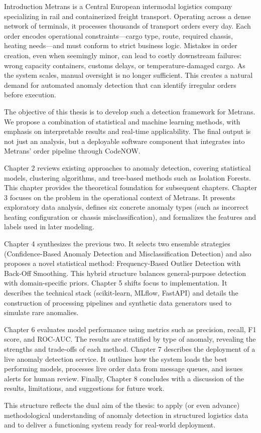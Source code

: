 \chap Introduction
Metrans is a Central European intermodal logistics company specializing in rail and containerized freight transport. Operating across a dense network of terminals, it processes thousands of transport orders every day. Each order encodes operational constraints—cargo type, route, required chassis, heating needs—and must conform to strict business logic. Mistakes in order creation, even when seemingly minor, can lead to costly downstream failures: wrong capacity containers, customs delays, or temperature-damaged cargo. As the system scales, manual oversight is no longer sufficient. This creates a natural demand for automated anomaly detection that can identify irregular orders before execution.

The objective of this thesis is to develop such a detection framework for Metrans. We propose a combination of statistical and machine learning methods, with emphasis on interpretable results and real-time applicability. The final output is not just an analysis, but a deployable software component that integrates into Metrans’ order pipeline through CodeNOW.

Chapter 2 reviews existing approaches to anomaly detection, covering statistical models, clustering algorithms, and tree-based methods such as Isolation Forests. This chapter provides the theoretical foundation for subsequent chapters. Chapter 3 focuses on the problem in the operational context of Metrans. It presents exploratory data analysis, defines six concrete anomaly types (such as incorrect heating configuration or chassis misclassification), and formalizes the features and labels used in later modeling.

Chapter 4 synthesizes the previous two. It selects two ensemble strategies (Confidence-Based Anomaly Detection and Misclassification Detection) and also proposes a novel statistical method: Frequency-Based Outlier Detection with Back-Off Smoothing. This hybrid structure balances general-purpose detection with domain-specific priors. Chapter 5 shifts focus to implementation. It describes the technical stack (scikit-learn, MLflow, FastAPI) and details the construction of processing pipelines and synthetic data generators used to simulate rare anomalies.

Chapter 6 evaluates model performance using metrics such as precision, recall, F1 score, and ROC-AUC. The results are stratified by type of anomaly, revealing the strengths and trade-offs of each method. Chapter 7 describes the deployment of a live anomaly detection service. It outlines how the system loads the best performing models, processes live order data from message queues, and issues alerts for human review. Finally, Chapter 8 concludes with a discussion of the results, limitations, and suggestions for future work.

This structure reflects the dual aim of the thesis: to apply (or even advance) methodological understanding of anomaly detection in structured logistics data and to deliver a functioning system ready for real-world deployment.
